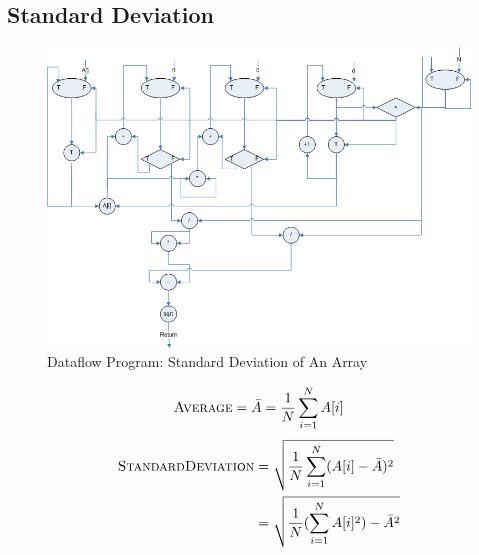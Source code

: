 \documentclass[12pt]{article}
\begin{document}
\subsection{Standard Deviation}
\begin{figure}[h!]
	\begin{center}
		\includegraphics[width=1.1\textwidth, angle=0]{std-deviation.png}
		\caption{\label{fig:std-deviation}Dataflow Program: Standard Deviation of An Array}
	\end{center}
\end{figure}
\begin{equation}
\textsc{Average} = \bar{A} =  \frac{1}{N}\sum_{i=1}^{N}A[i]
\end{equation}
\begin{align}
\textsc{StandardDeviation} &= \sqrt{\frac{1}{N}\sum_{i=1}^{N}(A[i]-\bar{A})^{2}} \nonumber\\
&= \sqrt{\frac{1}{N}(\sum_{i=1}^{N}A[i]^{2})-\bar{A}^{2}}
\end{align}
\end{document}

